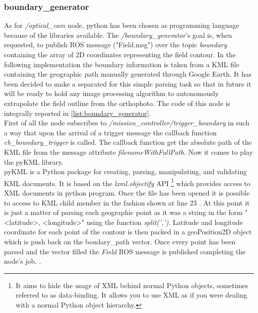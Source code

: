 \subsubsection{boundary\_generator} %
\label{ssub:boundary_generator}
As for \textit{/optical\_cam} node, python has been chosen as programming language because of the libraries available.
The \textit{/boundary\_generator}'s goal is, when requested, to publish ROS message ("Field.msg") over the topic \textit{boundary} containing the array of 2D coordinates representing the field contour.
In the following implementation the boundary information is taken from a KML file containing the geographic path manually generated through Google Earth. It has been decided to make a separated for this simple parsing task so that in future it will be ready to hold any image processing algorithm to autonomously extrapolate the field outline from the orthophoto.
The code of this node is integrally reported in \autoref{list:boundary_generator}.\\
First of all the node subscribes to \textit{/mission\_controller/trigger\_boundary} in such a way that upon the arrival of a trigger message the callback function \textit{cb\_boundary\_trigger} is called. The callback function get the absolute path of the KML file from the message attribute \textit{filenameWithFullPath}. Now it comes to play the pyKML library.\\
pyKML is a Python package for creating, parsing, manipulating, and validating KML documents. It is based on the \textit{lxml.objectify} API \footnote{It aims to hide the usage of XML behind normal Python objects, sometimes referred to as data-binding. It allows you to use XML as if you were dealing with a normal Python object hierarchy.\cite{lxml}} which provides access to XML documents in python program. Once the file has been opened it is possible to access to KML child member in the fashion shown at line 23 . At this point it is just a matter of parsing each geographic point as it was a string in the form "<latitude>, <longitude>" using the function \textit{split(',')}.
Latitude and longitude coordinate for each point of the contour is then packed in a geoPosition2D object which is push back on the boudary\_path vector. Once every point has been parsed and the vector filled the \textit{Field} ROS message is published completing the node's job.
.


